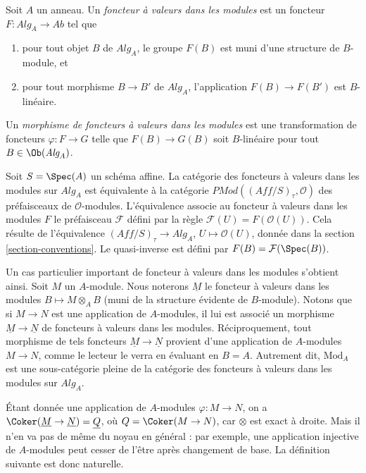 \begin{definition}
\label{definition-module-valued-functor}
Soit $A$ un anneau. Un {\it foncteur à valeurs dans les modules} est un foncteur
$F : \textit{Alg}_A \to \textit{Ab}$ tel que
\begin{enumerate}
\item pour tout objet $B$ de $\textit{Alg}_A$, le groupe
$F(B)$ est muni d'une structure de $B$-module, et
\item pour tout morphisme $B \to B'$ de $\textit{Alg}_A$, l'application
$F(B) \to F(B')$ est $B$-linéaire.
\end{enumerate}
Un {\it morphisme de foncteurs à valeurs dans les modules} est une transformation
de foncteurs $\varphi : F \to G$ telle que $F(B) \to G(B)$ soit $B$-linéaire
pour tout $B \in \Ob(\textit{Alg}_A)$.
\end{definition}

\noindent
Soit $S = \Spec(A)$ un schéma affine.
La catégorie des foncteurs à valeurs dans les modules sur $\textit{Alg}_A$ est
équivalente à la catégorie
$\textit{PMod}((\textit{Aff}/S)_\tau, \mathcal{O})$
des préfaisceaux de $\mathcal{O}$-modules. L'équivalence associe
au foncteur à valeurs dans les modules $F$ le
préfaisceau $\mathcal{F}$ défini par la règle
$\mathcal{F}(U) = F(\mathcal{O}(U))$.
Cela résulte de l'équivalence
$(\textit{Aff}/S)_\tau \to \textit{Alg}_A$, $U \mapsto \mathcal{O}(U)$,
donnée dans la section \ref{section-conventions}.
Le quasi-inverse est défini par $F(B) = \mathcal{F}(\Spec(B))$.

\medskip\noindent
Un cas particulier important de foncteur à valeurs dans les modules s'obtient ainsi.
Soit $M$ un $A$-module. Nous noterons $\underline{M}$ le
foncteur à valeurs dans les modules $B \mapsto M \otimes_A B$ (muni de la structure
évidente de $B$-module). Notons que si $M \to N$ est une application de $A$-modules,
il lui est associé un morphisme $\underline{M} \to \underline{N}$ de foncteurs
à valeurs dans les modules. Réciproquement, tout morphisme de tels foncteurs
$\underline{M} \to \underline{N}$ provient d'une application de $A$-modules $M \to N$,
comme le lecteur le verra en évaluant en $B = A$. Autrement dit,
$\text{Mod}_A$ est une sous-catégorie pleine
de la catégorie des foncteurs à valeurs dans les modules sur $\textit{Alg}_A$.

\medskip\noindent
Étant donnée une application de $A$-modules $\varphi : M \to N$, on a
$\Coker(\underline{M} \to \underline{N}) =
\underline{Q}$, où $Q = \Coker(M \to N)$, car $\otimes$
est exact à droite. Mais il n'en va pas de même
du noyau en général : par exemple, une application injective de
$A$-modules peut cesser de l'être après changement de base. La définition
suivante est donc naturelle.

